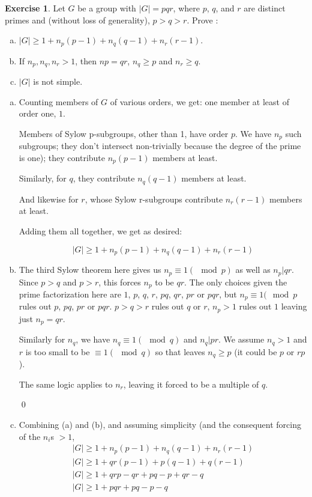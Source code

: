 \documentclass[11pt,oneside]{article}
\numberwithin{equation}{section}
\theoremstyle{definition}
\newtheorem{exercise}{Exercise}
\begin{document}
\begin{exercise}
  Let $G$ be a group with $|G| = pqr$, where $p$, $q$, and $r$ are distinct primes and
  (without loss of generality), $p > q > r$.  Prove :
  \begin{enumerate}[(a)]
  \item
    $|G| \geq 1 + n_p (p-1) + n_q (q-1) + n_r (r - 1)$.
  \item
    If $n_p, n_q, n_r > 1$, then $np = qr$, $n_q \geq p$ and $n_r \geq q$.
  \item
    $|G|$ is not simple.
  \end{enumerate}
\end{exercise}
\begin{solution}
  \begin{enumerate}[(a)]
  \item
    Counting members of $G$ of various orders, we get:
    one member at least of order one, $1$.

    Members of Sylow p-subgroups, other than 1, have order $p$. We
    have $n_p$ such subgroups; they don't intersect non-trivially
    because the degree of the prime is one); they contribute $n_p (p-1)$ members at least.

    Similarly, for $q$, they contribute $n_q (q-1)$ members at least.

    And likewise for $r$, whose Sylow r-subgroups contribute $n_r (r - 1)$ members at least.

    Adding them all together, we get as desired:

    \[
    | G | \geq  1 + n_p (p-1) + n_q (q-1) + n_r (r - 1)
    \]

  \item
    The third Sylow theorem here gives us $n_p \equiv 1 (\mod p)$ as well as $n_p | qr$.  Since
    $p >q$ and $p > r$, this forces $n_p$ to be $qr$.  The only choices given the prime factorization
    here are $1$, $p$, $q$, $r$, $pq$, $qr$, $pr$ or $pqr$, but $n_p \equiv 1 (\mod p$ rules out
    $p$, $pq$, $pr$ or $pqr$.  $p > q > r$ rules out $q$ or $r$, $n_p > 1$ rules out $1$ leaving just $n_p = qr$.

    Similarly for $n_q$, we have $n_q \equiv 1 ( \mod q ) $ and $n_q | pr$.  We assume $  n_q > 1$
    and $ r$ is too small to be $\equiv 1 (\mod q)$ so that leaves $n_q \geq p$ (it could be $p$ or $rp$).

    The same logic applies to $n_r$, leaving it forced to be a multiple of $q$.

    \qed
  \item
    Combining (a) and (b), and assuming simplicity (and the consequent forcing of the $n_i$s $>1$,
    \begin{align*}
    |G| \geq 1 + n_p (p -1) + n_q(q - 1) + n_r(r-1) \\
    |G| \geq 1 + qr (p -1) + p(q - 1) + q(r-1) \\
    |G| \geq 1 + qrp -qr + pq - p + qr-q \\
    |G| \geq 1 + pqr + pq - p -q
    \end{align*}


\end{enumerate}
\end{solution}
\end{document}
